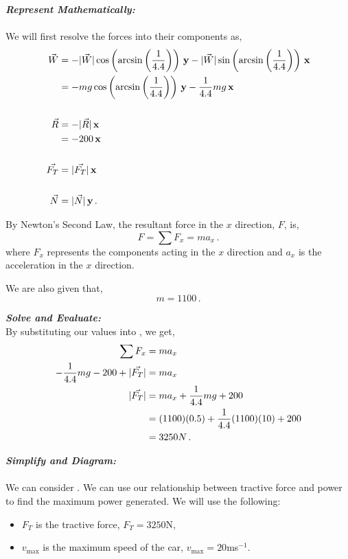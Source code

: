\begin{subquestions}
\begin{subsubquestions}
\textbf{\textit{Represent Mathematically:}} \\ \\
We will first resolve the forces into their components as,
\begin{align}
	\vec{W} & = -|\vec{W}|\cos\left({\arcsin\left(\frac{1}{4.4}\right)}\right)\,\mathbf{y}-|\vec{W}|\sin\left({\arcsin\left(\frac{1}{4.4}\right)}\right)\,\mathbf{x} \nonumber \\
	        & = -mg\cos\left({\arcsin\left(\frac{1}{4.4}\right)}\right)\,\mathbf{y}-\frac{1}{4.4}mg\,\mathbf{x} \\ \nonumber \\
	\vec{R} & = -|\vec{R}|\,\mathbf{x} \nonumber \\
	        & = -200 \,\mathbf{x} \\ \nonumber \\
	\vec{F_T} & = |\vec{F_T}|\,\mathbf{x} \\ \nonumber \\
	\vec{N} & = |\vec{N}|\,\mathbf{y} \,.
\end{align}

By Newton's Second Law, the resultant force in the $x$ direction, $F$, is,
\begin{equation}
	F = \sum F_x = ma_x \,. \label{2011:q5:Newt1}
\end{equation}
where $F_x$ represents the components acting in the $x$ direction and $a_x$ is the acceleration in the $x$ direction.

We are also given that,
\begin{equation}
	m = 1100 \,.
\end{equation}



\textbf{\textit{Solve and Evaluate:}} \nn \\
By substituting our values into , we get,
\begin{align}
	\sum F_x & = ma_x \nonumber \\
	-\frac{1}{4.4}mg-200+|\vec{F_T}| & = ma_x \nonumber \\
	|\vec{F_T}| & = ma_x +\frac{1}{4.4}mg+200 \nonumber \\
	            & = (1100)(0.5)+\frac{1}{4.4}(1100)(10)+200 \nonumber \\
	            & = 3250N \,.
\end{align}


\subsubquestion

\textbf{\textit{Simplify and Diagram:}} \\ \\
We can consider . We can use our relationship between tractive force and power to find the maximum power generated.
We will use the following:
\begin{itemize}
	\item $F_T$ is the tractive force, $F_T=3250$N,
	\item $v_\text{max}$ is the maximum speed of the car, $v_{\text{max}}=20$ms$^{-1}$.
\end{itemize}





\end{subsubquestions}
\end{subquestions}
